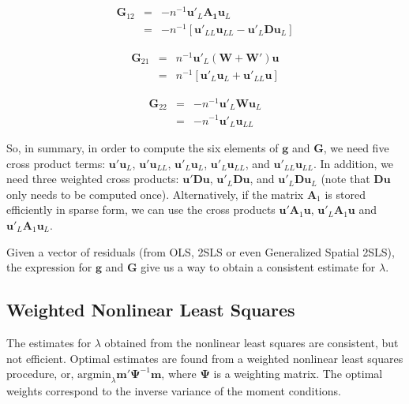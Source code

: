 \documentclass{article}
\begin{document}
\begin{eqnarray}
\mathbf{G}_{12} &=& - n^{-1} \mathbf{u'}_L \mathbf{A_1} \mathbf{u}_L\label{eq:G12}\\
   &=& - n^{-1} [ \mathbf{u'}_{LL} \mathbf{u}_{LL} - \mathbf{u'}_L \mathbf{D} \mathbf{u}_L ]\nonumber
\end{eqnarray}

\begin{eqnarray}
 \mathbf{G}_{21} &=& n^{-1} \mathbf{u'}_L (\mathbf{W} + \mathbf{W'}) \mathbf{u} \label{eq:G21}\\
   &=& n^{-1} [ \mathbf{u'}_L \mathbf{u}_L + \mathbf{u'}_{LL} \mathbf{u} ]\nonumber
\end{eqnarray}

\begin{eqnarray}
 \mathbf{G}_{22} &=& - n^{-1} \mathbf{u'}_L \mathbf{W} \mathbf{u}_L \label{eq:G22}\\
    &=& - n^{-1} \mathbf{u'}_L \mathbf{u}_{LL}\nonumber
\end{eqnarray}

So, in summary, in order to compute the six elements of $\mathbf{g}$ and $\mathbf{G}$,
we need five cross product terms: $\mathbf{u'} \mathbf{u}_L$, $\mathbf{u'} \mathbf{u}_{LL}$,
$\mathbf{u'}_L \mathbf{u}_L$, $\mathbf{u'}_L \mathbf{u}_{LL}$, and
$\mathbf{u'}_{LL} \mathbf{u}_{LL}$. In addition, we need three weighted cross products:
$\mathbf{u'} \mathbf{D} \mathbf{u}$, $\mathbf{u'}_L \mathbf{D} \mathbf{u}$, and
$\mathbf{u'}_L \mathbf{D} \mathbf{u}_L$ (note that $\mathbf{Du}$ only needs to be
computed once). Alternatively, if the matrix $\mathbf{A}_1$ is stored efficiently in sparse form,
we can use the cross products $\mathbf{u'}\mathbf{A}_1 \mathbf{u}$, $\mathbf{u'}_L \mathbf{A}_1 \mathbf{u}$ and $\mathbf{u'}_L \mathbf{A}_1 \mathbf{u}_L$.

Given a vector of residuals (from OLS, 2SLS or even Generalized Spatial 2SLS), the expression
for $\mathbf{g}$ and $\mathbf{G}$ give us a way to obtain a consistent estimate for $\lambda$.

\subsection{Weighted Nonlinear Least Squares}\label{ss:weightedgmm}
The estimates for $\lambda$ obtained from the nonlinear least squares are consistent,
but not efficient. Optimal estimates are found from a weighted nonlinear least squares
procedure, or, $\mbox{argmin}_\lambda \mathbf{m'}\mathbf{\mathbf{\Psi}}^{-1} \mathbf{m}$, where $\mathbf{\Psi}$ is a weighting matrix.
The optimal weights correspond to the inverse variance of the moment conditions.
\end{document}
